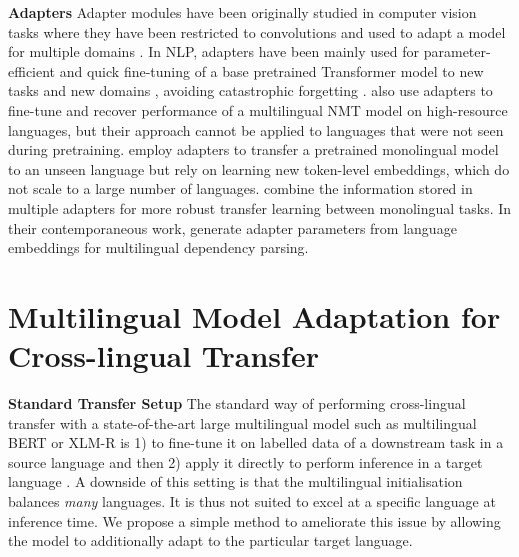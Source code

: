 \documentclass[11pt,a4paper]{article}
\begin{document}
\vspace{1.8mm}
\noindent \textbf{Adapters}\hspace{0.3mm} Adapter modules have been originally studied in computer vision tasks where they have been restricted to convolutions and used to adapt a model for multiple domains \cite{Rebuffi2017adapters,Rebuffi2018}. In NLP, adapters have been mainly used for parameter-efficient and quick fine-tuning of a base pretrained Transformer model to new tasks  \cite{Houlsby2019adapters,Cooper2019adapters} and new domains \cite{Bapna2019adapters}, avoiding catastrophic forgetting \cite{McCloskey:1989,Santoro:2016arxiv}. \citet{Bapna2019adapters} also use adapters to fine-tune and recover performance of a multilingual NMT model on high-resource languages, but their approach cannot be applied to languages that were not seen during pretraining. \citet{Artetxe2020cross-lingual} employ adapters to transfer a pretrained monolingual model to an unseen language but rely on learning new token-level embeddings, which do not scale to a large number of languages. \citet{Pfeiffer2020adapterfusion} combine the information stored in multiple adapters for more robust transfer learning between monolingual tasks. In their contemporaneous work, \citet{ustun2020udapter} generate adapter parameters from language embeddings for multilingual dependency parsing.
 
\section{Multilingual Model Adaptation for Cross-lingual Transfer}
\label{s:adaptation}

\noindent \textbf{Standard Transfer Setup}\hspace{0.3mm}
The standard way of performing cross-lingual transfer with a state-of-the-art large multilingual model such as multilingual BERT or XLM-R is 1) to fine-tune it on labelled data of a downstream task in a source language and then 2) apply it directly to perform inference in a target language \cite{Hu2020xtreme}. A downside of this setting is that the multilingual initialisation balances \emph{many} languages. It is thus not suited to excel at a specific language at inference time. We propose a simple method to ameliorate this issue by allowing the model to additionally adapt to the particular target language.
 
\end{document}
